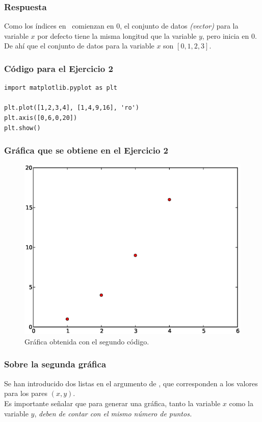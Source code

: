 \begin{frame}
\frametitle{Respuesta}	
Como los índices en \python\ comienzan en $0$, el conjunto de datos \emph{(vector)} para la variable $x$ por defecto tiene la misma longitud que la variable $y$, pero inicia en $0$. 
\\
\bigskip
De ahí que el conjunto de datos para la variable $x$ son $[0, 1, 2, 3]$.
\end{frame}
\begin{frame}[fragile]
\frametitle{Código para el Ejercicio 2}
\begin{lstlisting}[style=codigopython]
import matplotlib.pyplot as plt

plt.plot([1,2,3,4], [1,4,9,16], 'ro')
plt.axis([0,6,0,20])
plt.show()
\end{lstlisting}
\end{frame}
\begin{frame}[fragile]
\frametitle{Gráfica que se obtiene en el Ejercicio 2}
\begin{figure}
	\centering
	\includegraphics[scale=0.35]{Imagenes/plotEjercicio2.eps}
	\caption{Gráfica obtenida con el segundo código.}
\end{figure}
\end{frame}
\begin{frame}[fragile]
\frametitle{Sobre la segunda gráfica}
Se han introducido dos listas en el argumento de , que corresponden a los valores para los pares $(x, y)$.
\\
\bigskip
Es importante señalar que para generar una gráfica, tanto la variable $x$ como la variable $y$, \emph{deben de contar con el mismo número de puntos.}
\end{frame}
